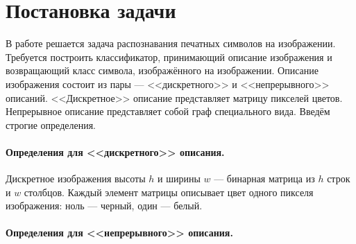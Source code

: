 \documentclass[12pt,twoside]{article}
\begin{document}
\section{Постановка задачи}

В работе решается задача распознавания печатных символов на изображении. Требуется построить классификатор, принимающий описание изображения и возвращающий класс символа, изображённого на изображении. Описание изображения состоит из пары --- <<дискретного>> и <<непрерывного>> описаний. <<Дискретное>> описание представляет матрицу пикселей цветов. Непрерывное описание представляет собой граф специального вида. Введём строгие определения.


\paragraph{Определения для <<дискретного>> описания.}


\begin{Def}
Дискретное изображения высоты $h$ и ширины $w$ --- бинарная матрица из $h$ строк и $w$ столбцов. Каждый элемент матрицы описывает цвет одного пикселя изображения: ноль --- черный, один --- белый.

\end{Def}

\paragraph{Определения для <<непрерывного>> описания.}
\end{document}
